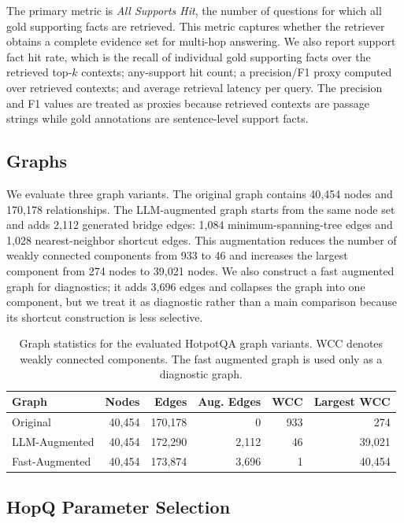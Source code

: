 The primary metric is \emph{All Supports Hit}, the number of questions for which
all gold supporting facts are retrieved. This metric captures whether the
retriever obtains a complete evidence set for multi-hop answering. We also
report support fact hit rate, which is the recall of individual gold supporting
facts over the retrieved top-$k$ contexts; any-support hit count; a precision/F1
proxy computed over retrieved contexts; and average retrieval latency per query.
The precision and F1 values are treated as proxies because retrieved contexts
are passage strings while gold annotations are sentence-level support facts.

\subsection{Graphs}
\label{sec:graphs}

We evaluate three graph variants. The original graph contains 40{,}454 nodes and
170{,}178 relationships. The LLM-augmented graph starts from the same node set
and adds 2{,}112 generated bridge edges: 1{,}084 minimum-spanning-tree edges and
1{,}028 nearest-neighbor shortcut edges. This augmentation reduces the number
of weakly connected components from 933 to 46 and increases the largest
component from 274 nodes to 39{,}021 nodes. We also construct a fast augmented
graph for diagnostics; it adds 3{,}696 edges and collapses the graph into one
component, but we treat it as diagnostic rather than a main comparison because
its shortcut construction is less selective.

\begin{table}[t]
\centering
\small
\begin{tabular}{lrrrrr}
\hline
Graph & Nodes & Edges & Aug. Edges & WCC & Largest WCC \\
\hline
Original & 40{,}454 & 170{,}178 & 0 & 933 & 274 \\
LLM-Augmented & 40{,}454 & 172{,}290 & 2{,}112 & 46 & 39{,}021 \\
Fast-Augmented & 40{,}454 & 173{,}874 & 3{,}696 & 1 & 40{,}454 \\
\hline
\end{tabular}
\caption{Graph statistics for the evaluated HotpotQA graph variants. WCC denotes weakly connected components. The fast augmented graph is used only as a diagnostic graph.}
\label{tab:graph-stats}
\end{table}

\subsection{HopQ Parameter Selection}
\label{sec:epsilon-selection}

